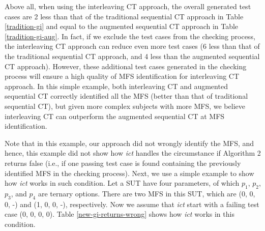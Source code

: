 \documentclass[journal,12pt,onecolumn,draftclsnofoot,]{IEEEtran}
\begin{document}

Above all, when using the interleaving CT approach,  the overall generated test cases are 2 less than that of the traditional sequential CT approach in Table \ref{tradition-gi} and equal to the augmented sequential CT approach in Table \ref{tradition-gi-aug}. In fact, if we exclude the test cases from the checking process, the interleaving CT approach can reduce even more test cases (6 less than that of the traditional sequential CT approach, and 4 less than the augmented sequential CT approach). However, these additional test cases generated in the checking process will ensure a high quality of MFS identification for interleaving CT approach. In this simple example, both interleaving CT and augmented sequential CT  correctly identified all the MFS (better than that of traditional sequential CT), but given more complex subjects with more MFS, we believe interleaving CT can outperform the augmented sequential CT at MFS identification.

Note that in this example, our approach did not wrongly identify the MFS, and hence, this example did not show how \emph{ict} handles the circumstance if Algorithm 2 returns false (i.e., if one passing test case is found containing the previously identified MFS in the checking process). Next, we use a simple example to show how \emph{ict} works in such condition. Let a SUT have four parameters, of which $p_{1}$, $p_{2}$, $p_{3}$, and $p_{4}$ are ternary options. There are two MFS in this SUT, which are (0, 0, 0, -) and (1, 0, 0, -), respectively. Now we assume that \emph{ict} start with a failing test case (0, 0, 0, 0). Table \ref{new-gi-returns-wrong} shows how \emph{ict} works in this condition.
\end{document}
